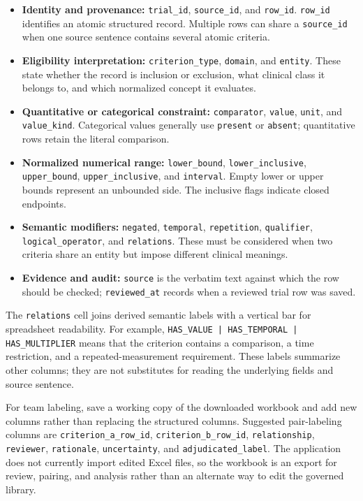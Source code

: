 \documentclass[11pt]{article}
\newcommand{\code}[1]{\texttt{#1}}
\begin{document}
\begin{itemize}
    \item \textbf{Identity and provenance:} \code{trial\_id}, \code{source\_id}, and \code{row\_id}. \code{row\_id} identifies an atomic structured record. Multiple rows can share a \code{source\_id} when one source sentence contains several atomic criteria.
    \item \textbf{Eligibility interpretation:} \code{criterion\_type}, \code{domain}, and \code{entity}. These state whether the record is inclusion or exclusion, what clinical class it belongs to, and which normalized concept it evaluates.
    \item \textbf{Quantitative or categorical constraint:} \code{comparator}, \code{value}, \code{unit}, and \code{value\_kind}. Categorical values generally use \code{present} or \code{absent}; quantitative rows retain the literal comparison.
    \item \textbf{Normalized numerical range:} \code{lower\_bound}, \code{lower\_inclusive}, \code{upper\_bound}, \code{upper\_inclusive}, and \code{interval}. Empty lower or upper bounds represent an unbounded side. The inclusive flags indicate closed endpoints.
    \item \textbf{Semantic modifiers:} \code{negated}, \code{temporal}, \code{repetition}, \code{qualifier}, \code{logical\_operator}, and \code{relations}. These must be considered when two criteria share an entity but impose different clinical meanings.
    \item \textbf{Evidence and audit:} \code{source} is the verbatim text against which the row should be checked; \code{reviewed\_at} records when a reviewed trial row was saved.
\end{itemize}

The \code{relations} cell joins derived semantic labels with a vertical bar for spreadsheet readability. For example, \code{HAS\_VALUE | HAS\_TEMPORAL | HAS\_MULTIPLIER} means that the criterion contains a comparison, a time restriction, and a repeated-measurement requirement. These labels summarize other columns; they are not substitutes for reading the underlying fields and source sentence.

For team labeling, save a working copy of the downloaded workbook and add new columns rather than replacing the structured columns. Suggested pair-labeling columns are \code{criterion\_a\_row\_id}, \code{criterion\_b\_row\_id}, \code{relationship}, \code{reviewer}, \code{rationale}, \code{uncertainty}, and \code{adjudicated\_label}. The application does not currently import edited Excel files, so the workbook is an export for review, pairing, and analysis rather than an alternate way to edit the governed library.
\end{document}
